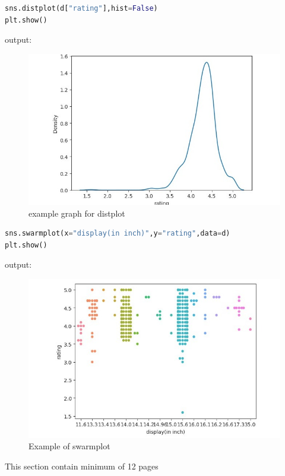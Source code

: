 \begin{lstlisting}[language=Python]
sns.distplot(d["rating"],hist=False)
plt.show()
 \end{lstlisting}
 output: 
\begin{figure}[h]
\centering
\footnotesize
\includegraphics[width=5in]{16.png}
\caption{example graph for distplot}
\label{fig:unevenlight}
\end{figure}
 \vspace{4\baselineskip}

\begin{lstlisting}[language=Python]
sns.swarmplot(x="display(in inch)",y="rating",data=d)
plt.show()
 \end{lstlisting}
 output:
\begin{figure}[h]
\centering
\footnotesize
\includegraphics[width=6in]{17.jpeg}
\caption{  Example  of swarmplot}
\label{fig:unevenlight}
\end{figure}
This section contain minimum of 12 pages